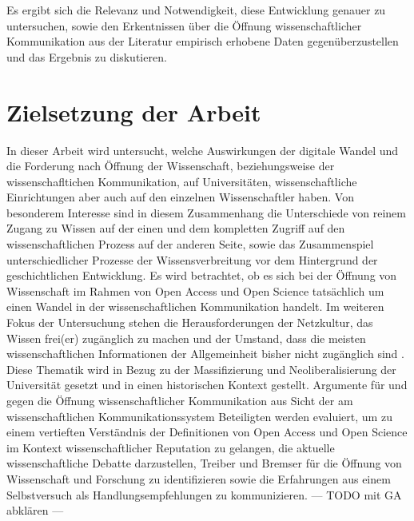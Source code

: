 Es ergibt sich die Relevanz und Notwendigkeit, diese Entwicklung genauer zu untersuchen, sowie den Erkentnissen über die Öffnung wissenschaftlicher Kommunikation aus der Literatur empirisch erhobene Daten gegenüberzustellen und das Ergebnis zu diskutieren.

\section{Zielsetzung der Arbeit}

In dieser Arbeit wird untersucht, welche Auswirkungen der digitale Wandel und die Forderung nach Öffnung der Wissenschaft, beziehungsweise der wissenschafltichen Kommunikation, auf Universitäten, wissenschaftliche Einrichtungen aber auch auf den einzelnen Wissenschaftler haben. Von besonderem Interesse sind in diesem Zusammenhang die Unterschiede von reinem Zugang zu Wissen auf der einen und dem kompletten Zugriff auf den wissenschaftlichen Prozess auf der anderen Seite, sowie das Zusammenspiel unterschiedlicher Prozesse der Wissensverbreitung vor dem Hintergrund der geschichtlichen Entwicklung. Es wird betrachtet, ob es sich bei der Öffnung von Wissenschaft im Rahmen von Open Access und Open Science tatsächlich um einen Wandel in der wissenschaftlichen Kommunikation handelt. Im weiteren Fokus der Untersuchung stehen die Herausforderungen der Netzkultur, das Wissen frei(er) zugänglich zu machen und der Umstand, dass die meisten wissenschaftlichen Informationen der Allgemeinheit bisher nicht zugänglich sind \cite{cite:6}. Diese Thematik wird in Bezug zu der Massifizierung und Neoliberalisierung der Universität gesetzt und in einen historischen Kontext gestellt. Argumente für und gegen die Öffnung wissenschaftlicher Kommunikation aus Sicht der am wissenschaftlichen Kommunikationssystem Beteiligten werden evaluiert, um zu einem vertieften Verständnis der Definitionen von Open Access und Open Science im Kontext wissenschaftlicher Reputation zu gelangen, die aktuelle wissenschaftliche Debatte darzustellen, Treiber und Bremser für die Öffnung von Wissenschaft und Forschung zu identifizieren sowie die Erfahrungen aus einem Selbstversuch als Handlungsempfehlungen zu kommunizieren. --- TODO mit GA abklären ---

